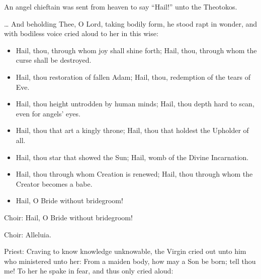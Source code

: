 \documentclass[twoside, letterpaper, 12pt]{report}
\begin{document}
\begin{priest}
  \item An angel chieftain was sent from heaven to say 
    “Hail!” unto the Theotokos. \thrice{}
  \item … And beholding Thee, O Lord, taking bodily form,
    he stood rapt in wonder,
    and with bodiless voice cried aloud to her in this wise:
\end{priest}

\begin{itemize}[label=\tiny{+},leftmargin=*]
\item Hail, thou, through whom joy shall shine forth; Hail, thou, through whom the curse shall be
destroyed.
\item Hail, thou restoration of fallen Adam; Hail, thou, redemption of the tears of Eve.
\item Hail, thou height untrodden by human minds; Hail, thou depth hard to scan, even for angels’
eyes.
\item Hail, thou that art a kingly throne; Hail, thou that holdest the Upholder of all.
\item Hail, thou star that showed the Sun; Hail, womb of the Divine Incarnation.
\item Hail, thou through whom Creation is renewed; Hail, thou through whom the Creator becomes
a babe.
\item Hail, O Bride without bridegroom! 
\end{itemize}

Choir: Hail, O Bride without bridegroom!



Choir: Alleluia.


Priest: Craving to know knowledge unknowable, the Virgin cried out unto him who ministered
unto her: From a maiden body, how may a Son be born; tell thou me! To her he spake
in fear, and thus only cried aloud:
\end{document}
